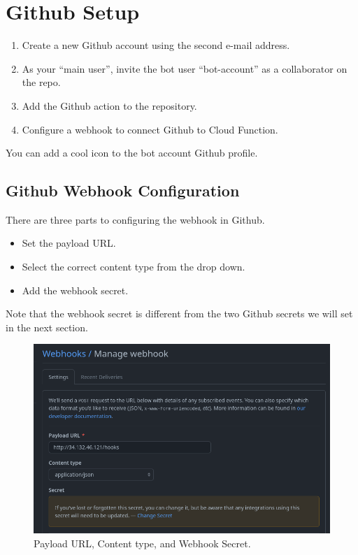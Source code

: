 \section{\label{sec:github}Github Setup}


\justifying
\begin{raggedright}
	\begin{enumerate}
		\item Create a new Github account using the second e-mail address.
		\item As your ``main user'', invite the bot user ``bot-account'' as a collaborator on the repo.
		\item Add the Github action to the repository.
		\item Configure a webhook to connect Github to Cloud Function.
	\end{enumerate}
\end{raggedright}
\vspace{2mm}

\justifying
You can add a cool icon to the bot account Github profile.


\subsection{\label{sec:webhook}Github Webhook Configuration}

\justifying
There are three parts to configuring the webhook in Github. 

\justifying
\begin{raggedright}
	\begin{itemize}
		\item Set the payload URL.
		\item Select the correct content type from the drop down.
		\item Add the webhook secret.
	\end{itemize}
\end{raggedright}
\vspace{2mm}

\justifying
Note that the webhook secret is different from the two Github secrets we will set in the next section.

\begin{figure}[ht]
	\includegraphics[width=12cm]{images/webhook1.png}
	\caption{Payload URL, Content type, and Webhook Secret.}
	\label{wh1}
\end{figure}
\vspace{2mm}


